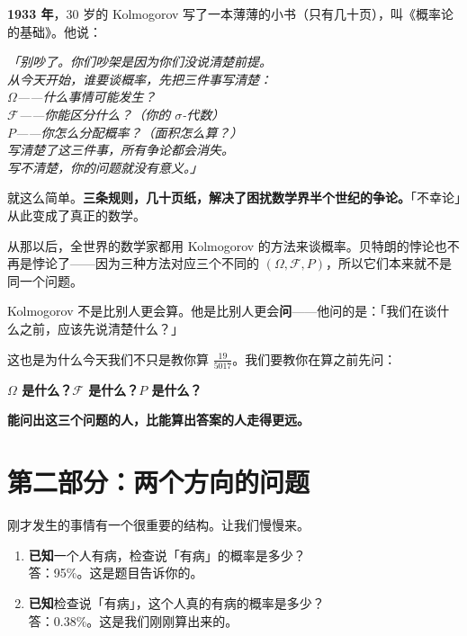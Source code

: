 \documentclass[12pt,a4paper]{article}
\begin{document}
\begin{storybox}
\textbf{1933 年}，30 岁的 Kolmogorov 写了一本薄薄的小书（只有几十页），叫《概率论的基础》。他说：

\begin{center}
\textit{「别吵了。你们吵架是因为你们没说清楚前提。}\\
\textit{从今天开始，谁要谈概率，先把三件事写清楚：}\\[4pt]
\textit{$\Omega$——什么事情可能发生？}\\
\textit{$\mathcal{F}$——你能区分什么？（你的 $\sigma$-代数）}\\
\textit{$P$——你怎么分配概率？（面积怎么算？）}\\[4pt]
\textit{写清楚了这三件事，所有争论都会消失。}\\
\textit{写不清楚，你的问题就没有意义。」}
\end{center}

就这么简单。\textbf{三条规则，几十页纸，解决了困扰数学界半个世纪的争论。}「不幸论」从此变成了真正的数学。

从那以后，全世界的数学家都用 Kolmogorov 的方法来谈概率。贝特朗的悖论也不再是悖论了——因为三种方法对应三个不同的 $(\Omega, \mathcal{F}, P)$，所以它们本来就不是同一个问题。
\end{storybox}

\begin{ideabox}[给你的启示]
Kolmogorov 不是比别人更会算。他是比别人更会\textbf{问}——他问的是：「我们在谈什么之前，应该先说清楚什么？」

这也是为什么今天我们不只是教你算 $\frac{19}{5017}$。我们要教你在算之前先问：

\textbf{$\Omega$ 是什么？$\mathcal{F}$ 是什么？$P$ 是什么？}

\textbf{能问出这三个问题的人，比能算出答案的人走得更远。}
\end{ideabox}

\section*{第二部分：两个方向的问题}

刚才发生的事情有一个很重要的结构。让我们慢慢来。

\begin{ideabox}
\begin{enumerate}[label=\textbf{(\Alph*)}]
  \item \textbf{已知}一个人有病，检查说「有病」的概率是多少？\\
        \hspace*{2em}答：95\%。这是题目告诉你的。
  \item \textbf{已知}检查说「有病」，这个人真的有病的概率是多少？\\
        \hspace*{2em}答：0.38\%。这是我们刚刚算出来的。
\end{enumerate}
\end{ideabox}
\end{document}
